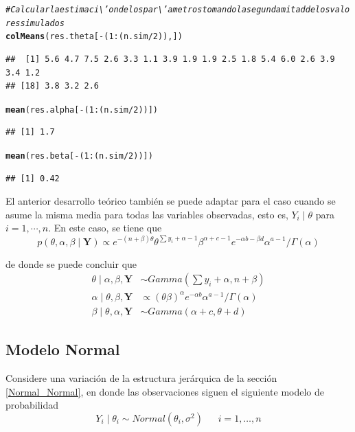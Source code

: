 \documentclass[10pt,openright]{book}\usepackage[]{graphicx}\usepackage[]{color}
\makeatletter
\newcommand{\hlnum}[1]{\textcolor[rgb]{0.686,0.059,0.569}{#1}}%
\newcommand{\hlcom}[1]{\textcolor[rgb]{0.678,0.584,0.686}{\textit{#1}}}%
\newcommand{\hlopt}[1]{\textcolor[rgb]{0,0,0}{#1}}%
\newcommand{\hlstd}[1]{\textcolor[rgb]{0.345,0.345,0.345}{#1}}%
\newcommand{\hlkwd}[1]{\textcolor[rgb]{0.737,0.353,0.396}{\textbf{#1}}}%
\newenvironment{kframe}{%
 \def\at@end@of@kframe{}%
 \ifinner\ifhmode%
  \def\at@end@of@kframe{\end{minipage}}%
  \begin{minipage}{\columnwidth}%
 \fi\fi%
 \def\FrameCommand##1{\hskip\@totalleftmargin \hskip-\fboxsep
 \colorbox{shadecolor}{##1}\hskip-\fboxsep
     \hskip-\linewidth \hskip-\@totalleftmargin \hskip\columnwidth}%
 \MakeFramed {\advance\hsize-\width
   \@totalleftmargin\z@ \linewidth\hsize
   \@setminipage}}%
 {\par\unskip\endMakeFramed%
 \at@end@of@kframe}
\newenvironment{knitrout}{}{} %
\makeatother
\begin{document}
\begin{knitrout}
\begin{kframe}\begin{alltt}
 \hlcom{# Calcular la estimaci\textbackslash{}'on de los par\textbackslash{}'ametros tomando la segunda mitad de los valores simulados}
 \hlkwd{colMeans}\hlstd{(res.theta[}\hlopt{-}\hlstd{(}\hlnum{1}\hlopt{:}\hlstd{(n.sim}\hlopt{/}\hlnum{2}\hlstd{)),])}
\end{alltt}
\begin{verbatim}
##  [1] 5.6 4.7 7.5 2.6 3.3 1.1 3.9 1.9 1.9 2.5 1.8 5.4 6.0 2.6 3.9 3.4 1.2
## [18] 3.8 3.2 2.6
\end{verbatim}
\begin{alltt}
 \hlkwd{mean}\hlstd{(res.alpha[}\hlopt{-}\hlstd{(}\hlnum{1}\hlopt{:}\hlstd{(n.sim}\hlopt{/}\hlnum{2}\hlstd{))])}
\end{alltt}
\begin{verbatim}
## [1] 1.7
\end{verbatim}
\begin{alltt}
 \hlkwd{mean}\hlstd{(res.beta[}\hlopt{-}\hlstd{(}\hlnum{1}\hlopt{:}\hlstd{(n.sim}\hlopt{/}\hlnum{2}\hlstd{))])}
\end{alltt}
\begin{verbatim}
## [1] 0.42
\end{verbatim}
\end{kframe}
\end{knitrout}

El anterior desarrollo te\'orico tambi\'en se puede adaptar para el caso cuando se asume la misma media para todas las variables observadas, esto es, $Y_i\mid\theta$ para $i=1,\cdots,n$. En este caso, se tiene que 
\begin{equation*}
p(\theta,\alpha,\beta\mid\mathbf{Y})\propto e^{-(n+\beta)\theta}\theta^{\sum y_i+\alpha-1}\beta^{\alpha+c-1}e^{-\alpha b-\beta d}\alpha^{a-1}/\Gamma(\alpha)
\end{equation*}

de donde se puede concluir que 
\begin{align}
\theta\mid\alpha,\beta,\mathbf{Y}&\sim Gamma(\sum y_i+\alpha,n+\beta)\label{Poisson_Gamma1}\\
\alpha\mid\theta,\beta,\mathbf{Y}&\propto(\theta\beta)^\alpha e^{-\alpha b}\alpha^{a-1}/\Gamma(\alpha)\label{Poisson_Gamma2}\\
\beta\mid\theta,\alpha,\mathbf{Y}&\sim Gamma(\alpha+c,\theta+d)\label{Poisson_Gamma3}
\end{align}

\subsection{Modelo Normal}
Considere una variaci\'on de la estructura jer\'arquica de la secci\'on \ref{Normal_Normal}, en donde las observaciones siguen el siguiente modelo de probabilidad
\begin{equation*}
Y_i \mid \theta_i \sim Normal(\theta_i,\sigma^2) \ \ \ \ \ \ \ i=1,\ldots,n
\end{equation*}
\end{document}
